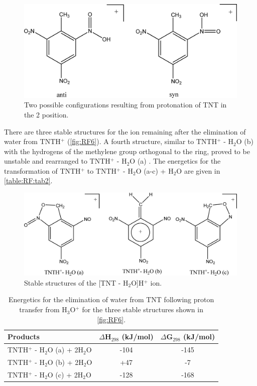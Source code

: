 \begin{figure}%
\centering
\includegraphics[height=0.2\textheight]{pics/RFpaper_fig5.png}
\caption{Two possible configurations resulting from protonation of TNT in the 2 position.}
\label{fig:RF5}
\end{figure}

There are three stable structures for the ion remaining after the elimination of water from TNTH$^+$ (\autoref{fig:RF6}). A fourth structure, similar to TNTH$^+$ - H$_2$O (b) with the hydrogens of the methylene group orthogonal to the ring, proved to be unstable and rearranged to TNTH$^+$ - H$_2$O (a) . The energetics for the transformation of TNTH$^+$ to TNTH$^+$ - H$_2$O (a-c) + H$_2$O are given in \autoref{table:RF:tab2}.


\begin{figure}%
\centering
\includegraphics[height=0.2\textheight]{pics/RFpaper_fig6.png}
\caption{Stable structures of the [TNT - H$_2$O]H$^+$ ion.}
\label{fig:RF6}
\end{figure}


\begin{table}%
\caption{Energetics for the elimination of water from TNT following proton transfer from H$_3$O$^+$ for the three stable structures shown in \autoref{fig:RF6}.}
\label{table:RF:tab2}
\begin{tabular}{lcc}
\hline
\textbf{Products} & \textbf{$\Delta$H$_{298}$ (kJ/mol)} & \textbf{$\Delta$G$_{298}$ (kJ/mol)} \\
\hline
TNTH$^+$ - H$_2$O (a) + 2H$_2$O & -104      & -145     \\
TNTH$^+$ - H$_2$O (b) + 2H$_2$O & +47       & -7     \\
TNTH$^+$ - H$_2$O (c) + 2H$_2$O & -128      & -168     \\
\hline
\end{tabular}
\end{table}


